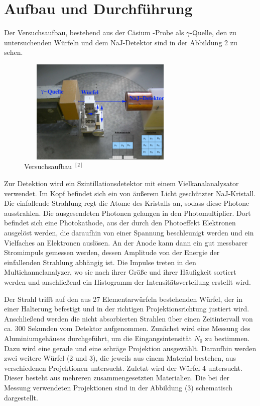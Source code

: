 \documentclass{article}
\begin{document}
\section{Aufbau und Durchführung}

Der Versuchsaufbau, bestehend aus der Cäsium -Probe als $\gamma$-Quelle, den zu untersuchenden Würfeln und dem NaJ-Detektor sind in der Abbildung 2 zu sehen. 

\begin{figure}[H]
	\centering
	\includegraphics[height=5cm, width=8cm]{aufbau.png}
	\caption{ Versuchsaufbau $^{[2]}$}   
	\label{fig: abb. 1}
\end{figure}



Zur Detektion wird ein Szintillationsdetektor mit einem Vielkanalanalysator verwendet. Im Kopf befindet sich ein von äußerem Licht geschützter NaJ-Kristall. Die einfallende Strahlung regt die Atome des Kristalls an, sodass diese Photone ausstrahlen. Die ausgesendeten Photonen gelangen in den Photomultiplier. Dort befindet sich eine Photokathode, aus der durch den Photoeffekt Elektronen ausgelöst werden, die daraufhin von einer Spannung beschleunigt werden und ein Vielfaches an Elektronen auslösen. An der Anode kann dann ein gut messbarer Stromimpuls gemessen werden, dessen Amplitude von der Energie der einfallenden Strahlung abhängig ist. Die Impulse treten in den Multichannelanalyzer, wo sie nach ihrer Größe und ihrer Häufigkeit sortiert werden und anschließend ein Histogramm der Intensitätsverteilung  erstellt wird. 

Der Strahl trifft auf den aus 27 Elementarwürfeln bestehenden Würfel, der in einer Halterung befestigt und in der richtigen Projektionsrichtung justiert wird. Anschließend werden die nicht absorbierten Strahlen über einen Zeitintervall von ca. 300 Sekunden vom Detektor aufgenommen. Zunächst wird eine Messung des Aluminiumgehäuses durchgeführt, um die Eingangsintensität $N_0$ zu bestimmen. Dazu wird eine gerade und eine schräge Projektion ausgewählt.  Daraufhin werden zwei weitere Würfel (2 und 3), die jeweils aus einem Material bestehen,  aus verschiedenen Projektionen untersucht. Zuletzt wird der Würfel 4 untersucht. Dieser besteht aus mehreren zusammengesetzten Materialien. Die bei der Messung verwendeten Projektionen sind in der Abbildung (3) schematisch dargestellt. 
\end{document}
